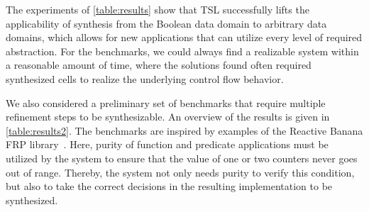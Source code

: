 The experiments of \cref{table:results} show that TSL successfully lifts the applicability of
synthesis from the Boolean data domain to arbitrary data domains,
which allows for new applications that can utilize every level of
required abstraction. For the benchmarks, we could always find a
realizable system within a reasonable amount of time, where the
solutions found often required synthesized cells to realize
the underlying control flow behavior.

We also considered a preliminary set of benchmarks that require
multiple refinement steps to be synthesizable. An overview of the
results is given in \mbox{\cref{table:results2}}. The benchmarks are inspired
by examples of the Reactive Banana FRP library~\cite{reactivebanana}.
Here, purity of function and predicate applications must be utilized
by the system to ensure that the value of one or two counters never
goes out of range. Thereby, the system not only needs purity to verify
this condition, but also to take the correct decisions in the
resulting implementation to be synthesized.
